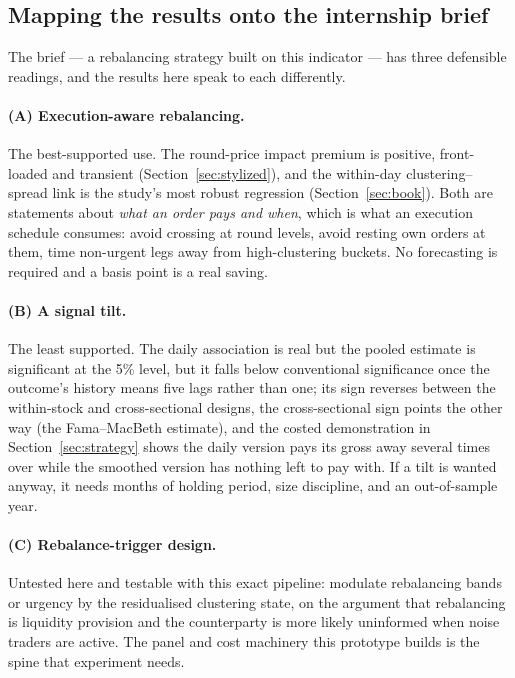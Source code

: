 \subsection{Mapping the results onto the internship brief}

The brief --- a rebalancing strategy built on this indicator --- has three
defensible readings, and the results here speak to each differently.

\paragraph{(A) Execution-aware rebalancing.} The best-supported use. The
round-price impact premium is positive, front-loaded and transient
(Section~\ref{sec:stylized}), and the within-day clustering--spread link is
the study's most robust regression (Section~\ref{sec:book}). Both are
statements about \emph{what an order pays and when}, which is what an
execution schedule consumes: avoid crossing at round levels, avoid resting own
orders at them, time non-urgent legs away from high-clustering buckets. No
forecasting is required and a basis point is a real saving.

\paragraph{(B) A signal tilt.} The least supported. The daily association is
real but the pooled estimate is significant at the 5\% level, but it falls below conventional significance once the outcome's history means five lags rather than one; its sign reverses between the within-stock and cross-sectional designs,
the cross-sectional sign points the other way (the Fama--MacBeth estimate), and
the costed demonstration in Section~\ref{sec:strategy} shows the daily
version pays its gross away several times over while the smoothed version has
nothing left to pay with. If a tilt is wanted anyway, it needs months of
holding period, size discipline, and an out-of-sample year.

\paragraph{(C) Rebalance-trigger design.} Untested here and testable with
this exact pipeline: modulate rebalancing bands or urgency by the residualised
clustering state, on the argument that rebalancing is liquidity provision and
the counterparty is more likely uninformed when noise traders are active. The
panel and cost machinery this prototype builds is the spine that experiment
needs.

